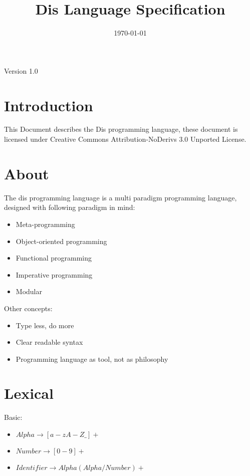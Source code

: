 \documentclass[a4paper]{article}
\title{Dis Language Specification}
\date{\today}
\author{}
\begin{document}
\maketitle
\begin{center}
Version 1.0
\end{center}
\newpage
\tableofcontents
\newpage

\section{Introduction}
This Document describes the Dis programming language, these document is licensed under Creative Commons Attribution-NoDerivs 3.0 Unported License.

\section{About}
The dis programming language is a multi paradigm programming language, designed with following paradigm in mind:
\begin{itemize}
\item Meta-programming
\item Object-oriented programming
\item Functional programming
\item Imperative programming
\item Modular
\end{itemize}

Other concepts:
\begin{itemize}
\item Type less, do more
\item Clear readable syntax
\item Programming language as tool, not as philosophy
\end{itemize}

\section{Lexical}
Basic:

\begin{itemize}
\item $Alpha \rightarrow [a-zA-Z\_]+$
\item $Number \rightarrow [0-9]+$
\item $Identifier \rightarrow Alpha (Alpha / Number)+$
\end{itemize}
\end{document}
